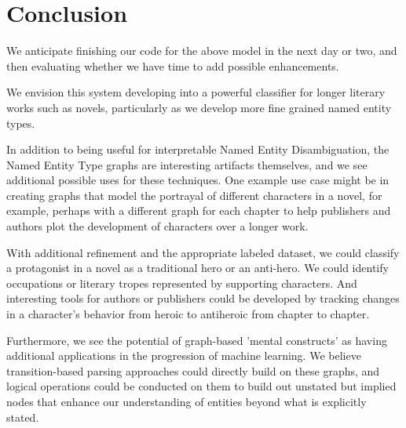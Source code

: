 \documentclass[11pt,a4paper]{article}
\begin{document}
\section{Conclusion}

We anticipate finishing our code for the above model in the next day or two, and then evaluating whether we have time to add possible enhancements.

We envision this system developing into a powerful classifier for longer literary works such as novels, particularly as we develop more fine grained named entity types.

In addition to being useful for interpretable Named Entity Disambiguation, the Named Entity Type graphs are interesting artifacts themselves, and we see additional possible uses for these techniques. One example use case might be in creating graphs that model the portrayal of different characters in a novel, for example, perhaps with a different graph for each chapter to help publishers and authors plot the development of characters over a longer work.

With additional refinement and the appropriate labeled dataset, we could classify a protagonist in a novel as a traditional hero or an anti-hero. We could identify occupations or literary tropes represented by supporting characters. And interesting tools for authors or publishers could be developed by tracking changes in a character's behavior from heroic to antiheroic from chapter to chapter.\cite{LampleNeuralArchitecturesNamed2016}

Furthermore, we see the potential of graph-based 'mental constructs' as having additional applications in the progression of machine learning. We believe transition-based parsing approaches could directly build on these graphs, and logical operations could be conducted on them to build out unstated but implied nodes that enhance our understanding of entities beyond what is explicitly stated. \cite{NivreIncrementalityDeterministicDependency2004}

%
%


\end{document}
